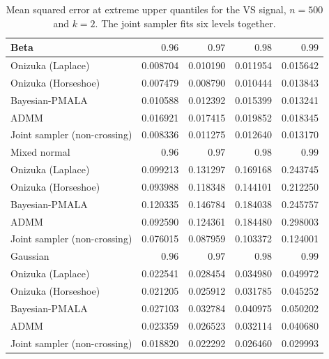 \begin{table}[!htbp]
\centering
\small
\caption{Mean squared error at extreme upper quantiles for the VS signal, $n=500$ and $k=2$. The joint sampler fits six levels together.}
\label{tab:vs_ext_upper_mse}
\begin{tabular}{lrrrr}
\toprule
Beta & $0.96$ & $0.97$ & $0.98$ & $0.99$ \\
\midrule
Onizuka (Laplace) & 0.008704 & 0.010190 & 0.011954 & 0.015642 \\
Onizuka (Horseshoe) & 0.007479 & 0.008790 & 0.010444 & 0.013843 \\
Bayesian-PMALA & 0.010588 & 0.012392 & 0.015399 & 0.013241 \\
ADMM & 0.016921 & 0.017415 & 0.019852 & 0.018345 \\
Joint sampler (non-crossing) & 0.008336 & 0.011275 & 0.012640 & 0.013170 \\
\midrule
Mixed normal & $0.96$ & $0.97$ & $0.98$ & $0.99$ \\
\midrule
Onizuka (Laplace) & 0.099213 & 0.131297 & 0.169168 & 0.243745 \\
Onizuka (Horseshoe) & 0.093988 & 0.118348 & 0.144101 & 0.212250 \\
Bayesian-PMALA & 0.120335 & 0.146784 & 0.184038 & 0.245757 \\
ADMM & 0.092590 & 0.124361 & 0.184480 & 0.298003 \\
Joint sampler (non-crossing) & 0.076015 & 0.087959 & 0.103372 & 0.124001 \\
\midrule
Gaussian & $0.96$ & $0.97$ & $0.98$ & $0.99$ \\
\midrule
Onizuka (Laplace) & 0.022541 & 0.028454 & 0.034980 & 0.049972 \\
Onizuka (Horseshoe) & 0.021205 & 0.025912 & 0.031785 & 0.045252 \\
Bayesian-PMALA & 0.027103 & 0.032784 & 0.040975 & 0.050202 \\
ADMM & 0.023359 & 0.026523 & 0.032114 & 0.040680 \\
Joint sampler (non-crossing) & 0.018820 & 0.022292 & 0.026460 & 0.029993 \\
\bottomrule
\end{tabular}
\end{table}

